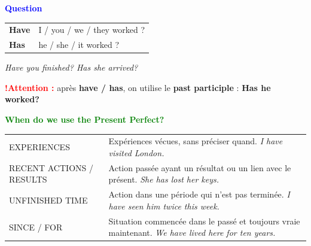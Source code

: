 \documentclass[a4paper,10pt]{article}
\newcommand{\sectiontitle}[2]{%
  {\large\bfseries\textcolor{#1}{#2}}%
}
\begin{document}
\begin{bluebox}
  \sectiontitle{Blue}{Question}

  \vspace{0.75mm}
  \begin{tabularx}{\textwidth}{@{}>{\color{Blue}\bfseries}l X@{}}
    Have & I / you / we / they worked ?\\
    Has & he / she / it worked ?
  \end{tabularx}

  \vspace{0.75mm}
  \textit{Have you finished? \qquad Has she arrived?}

  \vspace{1mm}
  \begin{tcolorbox}[
    colback=RedLight,colframe=RedLight,boxrule=0pt,
    arc=2mm,left=2.7mm,right=2.7mm,top=1.25mm,bottom=1.25mm
  ]
    \textcolor{Red}{\bfseries !\quad Attention :}
    après \textbf{have / has}, on utilise le \textbf{past participle} :
    \textbf{Has he worked?}
  \end{tcolorbox}
\end{bluebox}

\vspace{1.35mm}

\begin{greenbox}
  \sectiontitle{Green}{When do we use the Present Perfect?}

  \vspace{1mm}

  \begin{tabularx}{\textwidth}{@{}p{} X@{}}
    EXPERIENCES &
      Expériences vécues, sans préciser quand.
      \newline \textit{I have visited London.}\\[0.7mm]

    RECENT ACTIONS / RESULTS &
      Action passée ayant un résultat ou un lien avec le présent.
      \newline \textit{She has lost her keys.}\\[0.7mm]

    UNFINISHED TIME &
      Action dans une période qui n'est pas terminée.
      \newline \textit{I have seen him twice this week.}\\[0.7mm]

    SINCE / FOR &
      Situation commencée dans le passé et toujours vraie maintenant.
      \newline \textit{We have lived here for ten years.}
  \end{tabularx}
\end{greenbox}
\end{document}
